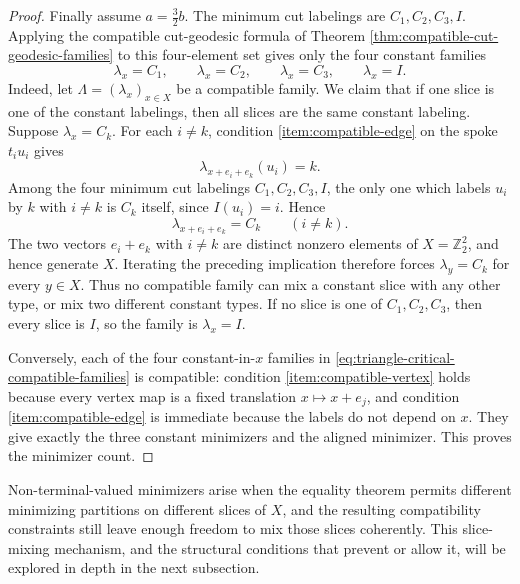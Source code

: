 \documentclass[11pt,oneside,letterpaper]{article}
\numberwithin{equation}{section}
\theoremstyle{definition}
\theoremstyle{remark}
\begin{document}
\begin{proof}
Finally assume $a=\frac32 b$.
The minimum cut labelings are $C_1,C_2,C_3,I$.  Applying the compatible
cut-geodesic formula of Theorem
\ref{thm:compatible-cut-geodesic-families} to this four-element set
gives only the four constant families
\begin{equation}\label{eq:triangle-critical-compatible-families}
\lambda_x= C_1,\qquad
\lambda_x= C_2,\qquad
\lambda_x= C_3,\qquad
\lambda_x= I.
\end{equation}
Indeed, let $\Lambda=(\lambda_x)_{x\in X}$ be a compatible family.  We
claim that if one slice is one of the constant labelings, then all
slices are the same constant labeling.  Suppose
$\lambda_x=C_k$.  For each $i\ne k$, condition
\ref{item:compatible-edge} on the spoke $t_i u_i$ gives
\begin{equation}
  \lambda_{x+e_i+e_k}(u_i)=k.
\end{equation}
Among the four minimum cut labelings $C_1,C_2,C_3,I$, the only one
which labels $u_i$ by $k$ with $i\ne k$ is $C_k$ itself, since
$I(u_i)=i$.  Hence
\begin{equation}
  \lambda_{x+e_i+e_k}=C_k
  \qquad (i\ne k).
\end{equation}
The two vectors $e_i+e_k$ with $i\ne k$ are distinct nonzero elements
of $X=\mathbb Z_2^2$, and hence generate $X$.  Iterating the preceding
implication therefore forces $\lambda_y=C_k$ for every $y\in X$.
Thus no compatible family can mix a constant slice with any other type,
or mix two different constant types.  If no slice is one of
$C_1,C_2,C_3$, then every slice is $I$, so the family is
$\lambda_x= I$.

Conversely, each of the four constant-in-$x$ families in
\eqref{eq:triangle-critical-compatible-families} is compatible:
condition \ref{item:compatible-vertex} holds because every vertex map
is a fixed translation $x\mapsto x+e_j$, and condition
\ref{item:compatible-edge} is immediate because the labels do not
depend on $x$.  They give exactly the three constant minimizers and the
aligned minimizer.  This proves the minimizer count.
\end{proof}


Non-terminal-valued minimizers arise when the equality theorem permits
different minimizing partitions on different slices of $X$, and
the resulting compatibility constraints still leave enough freedom to
mix those slices coherently. This slice-mixing mechanism, and the
structural conditions that prevent or allow it, will be explored in
depth in the next subsection.
\end{document}
